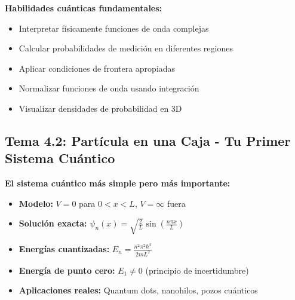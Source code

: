\begin{saberhacerbox}
	\textbf{Habilidades cuánticas fundamentales:}
	\begin{itemize}
		\item Interpretar físicamente funciones de onda complejas
		\item Calcular probabilidades de medición en diferentes regiones
		\item Aplicar condiciones de frontera apropiadas
		\item Normalizar funciones de onda usando integración
		\item Visualizar densidades de probabilidad en 3D
	\end{itemize}
\end{saberhacerbox}

\subsection{Tema 4.2: Partícula en una Caja - Tu Primer Sistema Cuántico}

\begin{saberbox}
	\textbf{El sistema cuántico más simple pero más importante:}
	\begin{itemize}
		\item \textbf{Modelo:} $V = 0$ para $0 < x < L$, $V = \infty$ fuera
		\item \textbf{Solución exacta:} $\psi_n(x) = \sqrt{\frac{2}{L}} \sin\left(\frac{n\pi x}{L}\right)$
		\item \textbf{Energías cuantizadas:} $E_n = \frac{n^2\pi^2\hbar^2}{2mL^2}$
		\item \textbf{Energía de punto cero:} $E_1 \neq 0$ (principio de incertidumbre)
		\item \textbf{Aplicaciones reales:} Quantum dots, nanohilos, pozos cuánticos
	\end{itemize}
\end{saberbox}

